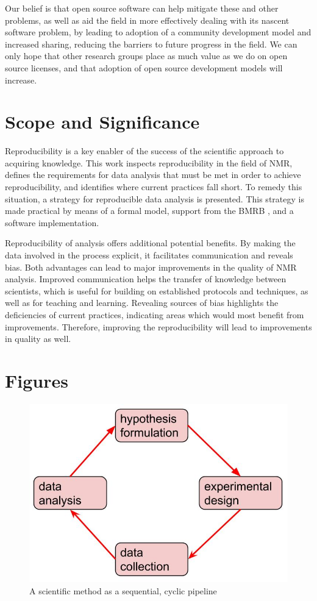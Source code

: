 Our belief is that open source software can help mitigate these and other 
problems, as well as aid the field in more effectively dealing with its 
nascent software problem, by leading to adoption of a community development 
model and increased sharing, reducing the barriers to future progress in 
the field.  We can only hope that other research groups place as much value 
as we do on open source licenses, and that adoption of open source development 
models will increase.  


\section{Scope and Significance}
Reproducibility is a key enabler of the success of the scientific approach to 
acquiring knowledge.  This work inspects reproducibility in the field of NMR, 
defines the requirements for data analysis that must be met in order to achieve 
reproducibility, and identifies where current practices fall short.  To remedy 
this situation, a strategy for reproducible data analysis is presented.  This 
strategy is made practical by means of a formal model, support from the BMRB 
\cite{bmrb}, and a software implementation.

Reproducibility of analysis offers additional potential benefits.  By making
the data involved in the process explicit, it facilitates communication and
reveals bias.  Both advantages can lead to major improvements in the quality
of NMR analysis.  Improved communication helps the transfer of knowledge
between scientists, which is useful for building on established protocols
and techniques, as well as for teaching and learning.  Revealing sources of
bias highlights the deficiencies of current practices, indicating areas 
which would most benefit from improvements.  Therefore, improving the 
reproducibility will lead to improvements in quality as well.


\clearpage
\section{Figures}

\begin{figure}[h]
  \includegraphics[scale=0.5]{figures/scientific_method_pipeline}
  \caption{A scientific method as a sequential, cyclic pipeline}
  \label{scientific_method_pipeline}
\end{figure}

